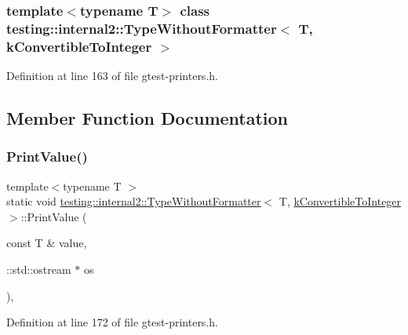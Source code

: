 \subsubsection*{template$<$typename T$>$\newline
class testing\+::internal2\+::\+Type\+Without\+Formatter$<$ T, k\+Convertible\+To\+Integer $>$}



Definition at line 163 of file gtest-\/printers.\+h.



\subsection{Member Function Documentation}
\mbox{\label{classtesting_1_1internal2_1_1TypeWithoutFormatter_3_01T_00_01kConvertibleToInteger_01_4_ab27a411afb608e730a57d232b3f4f486}} 
\subsubsection{\texorpdfstring{Print\+Value()}{PrintValue()}}
{\footnotesize\ttfamily template$<$typename T $>$ \\
static void \hyperlink{classtesting_1_1internal2_1_1TypeWithoutFormatter}{testing\+::internal2\+::\+Type\+Without\+Formatter}$<$ T, \hyperlink{namespacetesting_1_1internal2_aeb8161b0b3ee503347b0662d7028fd57a9bdcf3f1548f498b2b7f097306ea0224}{k\+Convertible\+To\+Integer} $>$\+::Print\+Value (\begin{DoxyParamCaption}\item[{const T \&}]{value,  }\item[{\+::std\+::ostream $\ast$}]{os }\end{DoxyParamCaption})\hspace{0.3cm}{\ttfamily [inline]}, {\ttfamily [static]}}



Definition at line 172 of file gtest-\/printers.\+h.


